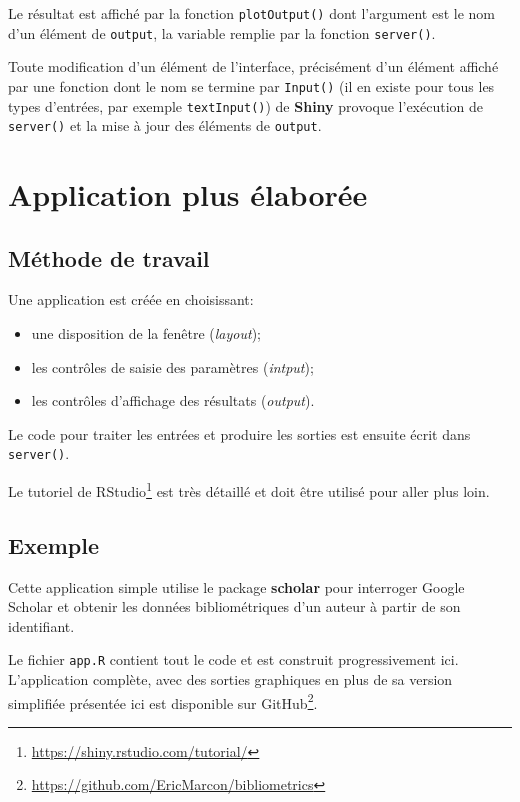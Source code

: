 \documentclass[
  11pt,
  french,
  a4paper,
  extrafontsizes,onecolumn,openright
  ]{memoir}
\providecommand{\tightlist}{%
  \setlength{\itemsep}{0pt}\setlength{\parskip}{0pt}}
\begin{document}
Le résultat est affiché par la fonction \texttt{plotOutput()} dont l'argument est le nom d'un élément de \texttt{output}, la variable remplie par la fonction \texttt{server()}.

Toute modification d'un élément de l'interface, précisément d'un élément affiché par une fonction dont le nom se termine par \texttt{Input()} (il en existe pour tous les types d'entrées, par exemple \texttt{textInput()}) de \textbf{Shiny} provoque l'exécution de \texttt{server()} et la mise à jour des éléments de \texttt{output}.

\hypertarget{application-plus-uxe9laboruxe9e}{%
\section{Application plus élaborée}\label{application-plus-uxe9laboruxe9e}}

\hypertarget{muxe9thode-de-travail}{%
\subsection{Méthode de travail}\label{muxe9thode-de-travail}}

Une application est créée en choisissant:

\begin{itemize}
\tightlist
\item
  une disposition de la fenêtre (\emph{layout});
\item
  les contrôles de saisie des paramètres (\emph{intput});
\item
  les contrôles d'affichage des résultats (\emph{output}).
\end{itemize}

Le code pour traiter les entrées et produire les sorties est ensuite écrit dans \texttt{server()}.

Le tutoriel de RStudio\footnote{\url{https://shiny.rstudio.com/tutorial/}} est très détaillé et doit être utilisé pour aller plus loin.

\hypertarget{exemple}{%
\subsection{Exemple}\label{exemple}}

Cette application simple utilise le package \textbf{scholar} pour interroger Google Scholar et obtenir les données bibliométriques d'un auteur à partir de son identifiant.

Le fichier \texttt{app.R} contient tout le code et est construit progressivement ici.
L'application complète, avec des sorties graphiques en plus de sa version simplifiée présentée ici est disponible sur GitHub\footnote{\url{https://github.com/EricMarcon/bibliometrics}}.
\end{document}
